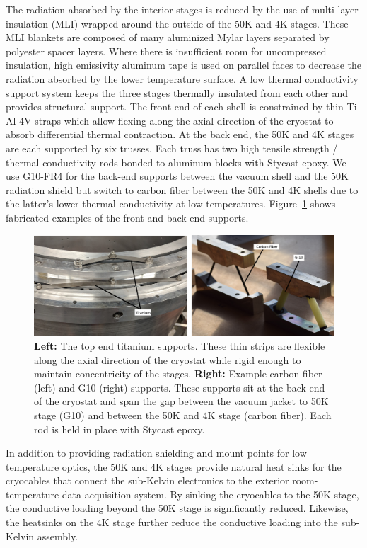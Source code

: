 \documentclass[]{spie}  %
\begin{document}
\clearpage


The radiation absorbed by the interior stages is reduced by the use of
multi-layer insulation (MLI) wrapped around the outside of the 50K and 4K
stages. These MLI blankets are composed of many aluminized Mylar layers
separated by polyester spacer layers. Where there is insufficient room for
uncompressed insulation, high emissivity aluminum tape is used on parallel
faces to decrease the radiation absorbed by the lower temperature surface.
A low thermal conductivity support system keeps the three stages thermally
insulated from each other and provides structural support. The front end of
each shell is constrained by thin Ti-Al-4V straps which allow flexing along the
axial direction of the cryostat to absorb differential thermal contraction. At
the back end, the 50K and 4K stages are each supported by six trusses. Each
truss has two high tensile strength / thermal conductivity rods bonded to
aluminum blocks with Stycast epoxy. We use G10-FR4 for the back-end supports
between the vacuum shell and the 50K radiation shield but switch to carbon
fiber between the 50K and 4K shells due to the latter's lower thermal
conductivity at low temperatures. Figure~\ref{fig:supports} shows fabricated
examples of the front and back-end supports.

\begin{figure}[t]
	\center
	\includegraphics{supports.png}
	\caption{\textbf{Left:} The top end titanium supports. These thin strips
	are flexible along the axial direction of the cryostat while rigid enough
	to maintain concentricity of the stages. \textbf{Right:} Example carbon fiber (left) and G10 (right) supports. These
	supports sit at the back end of the cryostat and span the gap between the
	vacuum jacket to 50K stage (G10) and between the 50K and 4K stage (carbon
	fiber). Each rod is held in place with Stycast epoxy.}
	\label{fig:supports}
\end{figure}



In addition to providing radiation shielding and mount points for low
temperature optics, the 50K and 4K stages provide natural heat sinks for the
cryocables that connect the sub-Kelvin electronics to the exterior
room-temperature data acquisition system. By sinking the cryocables to the 50K
stage, the conductive loading beyond the 50K stage is significantly reduced.
Likewise, the heatsinks on the 4K stage further reduce the conductive
loading into the sub-Kelvin assembly. 
\end{document}
